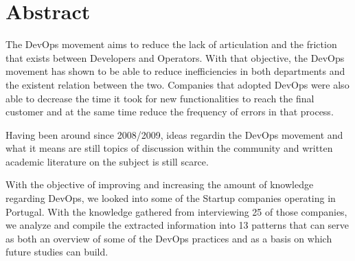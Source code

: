 \chapter*{Abstract}

The DevOps movement aims to reduce the lack of articulation and the friction that exists between Developers and Operators. With that objective, the DevOps movement has shown to be able to reduce inefficiencies in both departments and the existent relation between the two. Companies that adopted DevOps were also able to decrease the time it took for new functionalities to reach the final customer and at the same time reduce the frequency of errors in that process.

Having been around since 2008/2009, ideas regardin the DevOps movement and what it means are still topics of discussion within the community and written academic literature on the subject is still scarce.

With the objective of improving and increasing the amount of knowledge regarding DevOps, we looked into some of the Startup companies operating in Portugal. With the knowledge gathered from interviewing 25 of those companies, we analyze and compile the extracted information into 13 patterns that can serve as both an overview of some of the DevOps practices and as a basis on which future studies can build.
